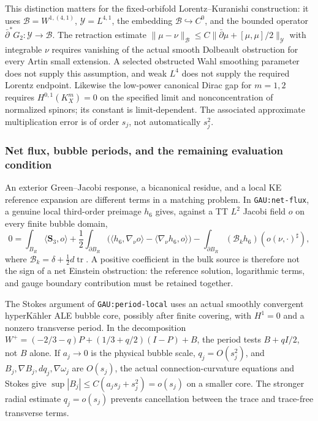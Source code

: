 \documentclass[a4paper,11pt]{article}
\numberwithin{equation}{section}
\theoremstyle{definition}
\newcommand{\tr}{\operatorname{tr}}
\begin{document}
This distinction matters for the fixed-orbifold Lorentz--Kuranishi construction: it uses
$\mathcal B=W^{1,(4,1)}$, $\mathcal Y=L^{4,1}$, the embedding $\mathcal B\hookrightarrow C^0$, and the bounded operator $\bar\partial^*G_2:\mathcal Y\to\mathcal B$.
The retraction estimate
$\|\mu-\nu\|_{\mathcal B}\le C\|\bar\partial\mu+[\mu,\mu]/2\|_{\mathcal Y}$
with integrable $\nu$ requires vanishing of the actual smooth Dolbeault obstruction for every Artin small extension. A selected obstructed Wahl smoothing parameter does not supply this assumption, and weak $L^4$ does not supply the required Lorentz endpoint. Likewise the low-power canonical Dirac gap for $m=1,2$ requires $H^{0,1}(K_X^m)=0$ on the specified limit and nonconcentration of normalized spinors; its constant is limit-dependent. The associated approximate multiplication error is of order $s_j$, not automatically $s_j^2$.

\subsubsection{Net flux, bubble periods, and the remaining evaluation condition}\label{sec:period-evaluation-tools}
An exterior Green--Jacobi response, a bicanonical residue, and a local KE reference expansion are different terms in a matching problem. In \texttt{GAU:net-flux}, a genuine local third-order preimage $h_6$ gives, against a TT $L^2$ Jacobi field $o$ on every finite bubble domain,
\begin{equation}\label{eq:KE-net-flux-interface}
0=\int_{B_R}\langle\mathbf S_3,o\rangle
+\frac12\int_{\partial B_R}
\bigl(\langle h_6,\nabla_\nu o\rangle-\langle\nabla_\nu h_6,o\rangle\bigr)
-\int_{\partial B_R}(\mathcal B_kh_6)(o(\nu,\cdot)^\sharp),
\end{equation}
where $\mathcal B_k=\delta+\tfrac12d\tr$. A positive coefficient in the bulk source is therefore not the sign of a net Einstein obstruction: the reference solution, logarithmic terms, and gauge boundary contribution must be retained together.

The Stokes argument of \texttt{GAU:period-local} uses an actual smoothly convergent hyperK\"ahler ALE bubble core, possibly after finite covering, with $H^1=0$ and a nonzero transverse period. In the decomposition
$W^+=(-2/3-q)P+(1/3+q/2)(I-P)+B$,
the period tests $B+qI/2$, not $B$ alone. If $a_j\to0$ is the physical bubble scale, $q_j=O(s_j^2)$, and $B_j,\nabla B_j,dq_j,\nabla\omega_j$ are $O(s_j)$, the actual connection-curvature equations and Stokes give
$\sup|B_j|\le C(a_js_j+s_j^2)=o(s_j)$ on a smaller core.
The stronger radial estimate $q_j=o(s_j)$ prevents cancellation between the trace and trace-free transverse terms.
\end{document}
